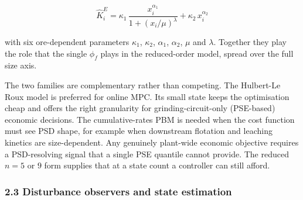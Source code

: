 \documentclass[
  14pt,
]{extarticle}
\begin{document}
\begingroup\small

\begin{equation}\hat{K}_i^{E}=\kappa_1\,\frac{x_i^{\alpha_1}}{1+\left(x_i/\mu\right)^{\lambda}}+\kappa_2\,x_i^{\alpha_2}\tag{5}\end{equation}

\endgroup

with six ore-dependent parameters \(\kappa_1\), \(\kappa_2\),
\(\alpha_1\), \(\alpha_2\), \(\mu\) and \(\lambda\). Together they play
the role that the single \(\phi_f\) plays in the reduced-order model,
spread over the full size axis.

The two families are complementary rather than competing. The Hulbert-Le
Roux model is preferred for online MPC. Its small state keeps the
optimisation cheap and offers the right granularity for
grinding-circuit-only (PSE-based) economic decisions. The
cumulative-rates PBM is needed when the cost function must see PSD
shape, for example when downstream flotation and leaching kinetics are
size-dependent. Any genuinely plant-wide economic objective requires a
PSD-resolving signal that a single PSE quantile cannot provide. The
reduced $n=5$ or $9$ form supplies that at a state count a
controller can still afford.

\subsubsection{2.3 Disturbance observers and state
estimation}\label{disturbance-observers-and-state-estimation}
\end{document}
